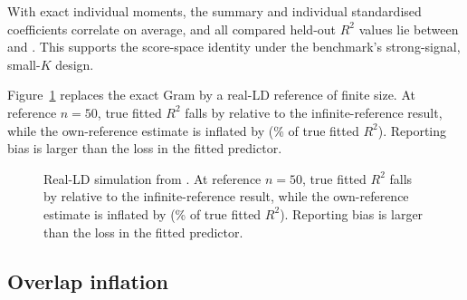 \documentclass[11pt,a4paper]{article}
\newcommand{\Rtwo}{\(R^2\)}
\begin{document}
With exact individual moments, the summary and individual
standardised coefficients correlate
\ReportSumstatBetaCorrelation{} on average, and all compared
held-out \Rtwo{} values lie between \ReportSumstatRtwoMin{} and
\ReportSumstatRtwoMax. This supports the score-space identity
under the benchmark's strong-signal, small-\(K\) design.

Figure~\ref{fig:ld-reference} replaces the exact Gram by a
real-LD reference of finite size. At reference \(n=50\), true
fitted \Rtwo{} falls by \ReportLdTrueDropNfifty{} relative to
the infinite-reference result, while the own-reference estimate
is inflated by \ReportLdInflationNfifty{}
(\ReportLdInflationNfiftyPct\% of true fitted \Rtwo{}).
Reporting bias is larger than the loss in the fitted predictor.

\begin{figure}[ht]
\centering
{}
\caption{Real-LD simulation from
\protect{}. At reference
\(n=50\), true fitted \Rtwo{} falls by \ReportLdTrueDropNfifty{}
relative to the infinite-reference result, while the
own-reference estimate is inflated by \ReportLdInflationNfifty{}
(\ReportLdInflationNfiftyPct\% of true fitted \Rtwo{}).
Reporting bias is larger than the loss in the fitted predictor.}
\label{fig:ld-reference}
\end{figure}

\subsection{Overlap inflation}
\label{sec:overlap}
\end{document}
